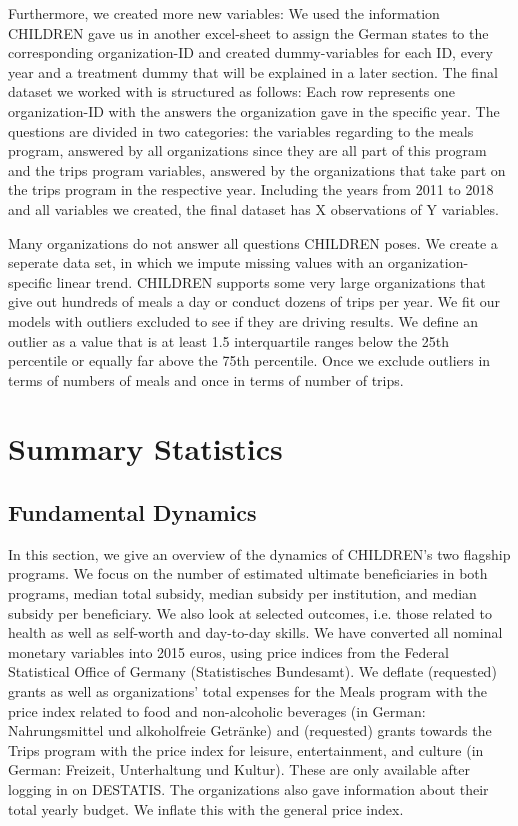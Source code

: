 \documentclass[12pt, a4paper, titlepage]{article}\usepackage[]{graphicx}\usepackage[]{color}
\begin{document}
Furthermore, we created more new variables: We used the information CHILDREN gave us in another excel-sheet to assign the German states to the corresponding organization-ID and created dummy-variables for each ID, every year and a treatment dummy that will be explained in a later section. 
The final dataset we worked with is structured as follows: Each row represents one organization-ID with the answers the organization gave in the specific year. The questions are divided in two categories: the variables regarding to the meals program, answered by all organizations since they are all part of this program and the trips program variables, answered by the organizations that take part on the trips program in the respective year. Including the years from 2011 to 2018 and all variables we created, the final dataset has X observations of Y variables.

Many organizations do not answer all questions CHILDREN poses. We create a seperate data set, in which we impute missing values with an organization-specific linear trend. CHILDREN supports some very large organizations that give out hundreds of meals a day or conduct dozens of trips per year. We fit our models with outliers excluded to see if they are driving results. We define an outlier as a value that is at least 1.5 interquartile ranges below the 25th percentile or equally far above the 75th percentile. Once we exclude outliers in terms of numbers of meals and once in terms of number of trips.





\section{Summary Statistics}
\subsection{Fundamental Dynamics} 

In this section, we give an overview of the dynamics of CHILDREN's two flagship programs. We focus on the number of estimated ultimate beneficiaries in both programs, median total subsidy, median subsidy per institution, and median subsidy per beneficiary. We also look at selected outcomes, i.e. those related to health as well as self-worth and day-to-day skills. We have converted all nominal monetary variables into 2015 euros, using price indices from the Federal Statistical Office of Germany (Statistisches Bundesamt). We deflate (requested) grants as well as organizations' total expenses for the Meals program  with the price index related to food and non-alcoholic beverages (in German: Nahrungsmittel und alkoholfreie Getränke) and (requested) grants towards the Trips program with the price index for leisure, entertainment, and culture (in German: Freizeit, Unterhaltung und Kultur). These are only available after logging in on DESTATIS. The organizations also gave information about their total yearly budget. We inflate this with the general price index.
\end{document}
